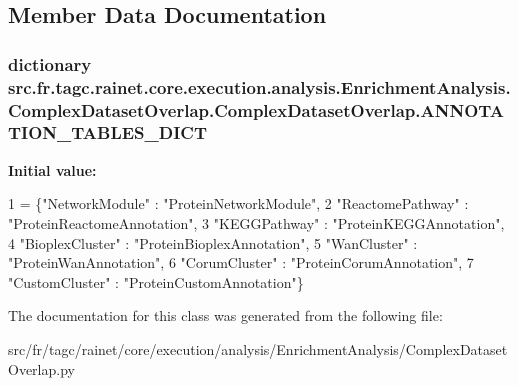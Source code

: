 \subsection{Member Data Documentation}
\hypertarget{classsrc_1_1fr_1_1tagc_1_1rainet_1_1core_1_1execution_1_1analysis_1_1EnrichmentAnalysis_1_1Comple500f6ec22a9a1e615c8c425ff66b262_a6339b1bc231875ff22b765265448638a}{
\subsubsection[{A\-N\-N\-O\-T\-A\-T\-I\-O\-N\-\_\-\-T\-A\-B\-L\-E\-S\-\_\-\-D\-I\-C\-T}]{\setlength{\rightskip}{0pt plus 5cm}dictionary src.\-fr.\-tagc.\-rainet.\-core.\-execution.\-analysis.\-Enrichment\-Analysis.\-Complex\-Dataset\-Overlap.\-Complex\-Dataset\-Overlap.\-A\-N\-N\-O\-T\-A\-T\-I\-O\-N\-\_\-\-T\-A\-B\-L\-E\-S\-\_\-\-D\-I\-C\-T\hspace{0.3cm}{\ttfamily [static]}}}\label{classsrc_1_1fr_1_1tagc_1_1rainet_1_1core_1_1execution_1_1analysis_1_1EnrichmentAnalysis_1_1Comple500f6ec22a9a1e615c8c425ff66b262_a6339b1bc231875ff22b765265448638a}
{\bfseries Initial value\-:}
\begin{DoxyCode}
1 = \{\textcolor{stringliteral}{"NetworkModule"} : \textcolor{stringliteral}{"ProteinNetworkModule"},
2                               \textcolor{stringliteral}{"ReactomePathway"} : \textcolor{stringliteral}{"ProteinReactomeAnnotation"},
3                               \textcolor{stringliteral}{"KEGGPathway"} : \textcolor{stringliteral}{"ProteinKEGGAnnotation"},
4                               \textcolor{stringliteral}{"BioplexCluster"} : \textcolor{stringliteral}{"ProteinBioplexAnnotation"},
5                               \textcolor{stringliteral}{"WanCluster"} : \textcolor{stringliteral}{"ProteinWanAnnotation"},
6                               \textcolor{stringliteral}{"CorumCluster"} : \textcolor{stringliteral}{"ProteinCorumAnnotation"},
7                               \textcolor{stringliteral}{"CustomCluster"} : \textcolor{stringliteral}{"ProteinCustomAnnotation"}\}
\end{DoxyCode}


The documentation for this class was generated from the following file\-:\begin{DoxyCompactItemize}
\item 
src/fr/tagc/rainet/core/execution/analysis/\-Enrichment\-Analysis/Complex\-Dataset\-Overlap.\-py\end{DoxyCompactItemize}
